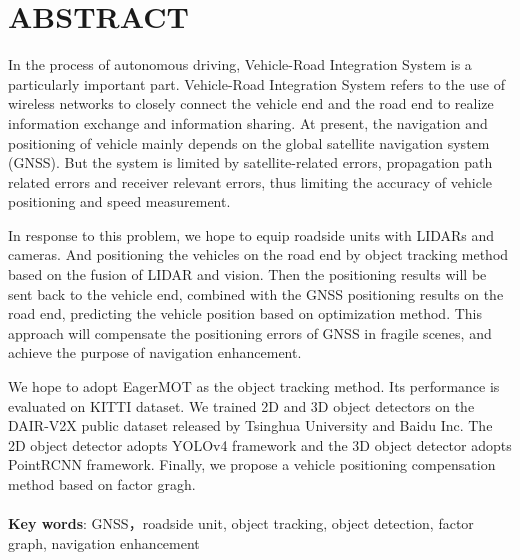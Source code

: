 \newpage
{}
\section*{ABSTRACT}

In the process of autonomous driving, Vehicle-Road Integration System is a particularly important part. Vehicle-Road Integration System refers to the use of wireless networks to closely connect the vehicle end and the road end to realize information exchange and information sharing. At present, the navigation and positioning of vehicle mainly depends on the global satellite navigation system (GNSS). But the system is limited by satellite-related errors, propagation path related errors and receiver relevant errors, thus limiting the accuracy of vehicle positioning and speed measurement.

In response to this problem, we hope to equip roadside units with LIDARs and cameras. And positioning the vehicles on the road end by object tracking method based on the fusion of  
LIDAR and vision. Then the positioning results will be sent back to the vehicle end, combined with the GNSS positioning results on the road end, predicting the vehicle position based on optimization method. This approach will compensate the positioning errors of GNSS in fragile scenes, and achieve the purpose of navigation enhancement.

We hope to adopt EagerMOT as the object tracking method. Its performance is evaluated on KITTI dataset. We trained 2D and 3D object detectors on the DAIR-V2X public dataset released by Tsinghua University and Baidu Inc. The 2D object detector adopts YOLOv4 framework and the 3D object detector adopts PointRCNN framework. Finally, we propose a vehicle positioning compensation method based on factor gragh.\\
~\\ 
\textbf{Key words}: GNSS，roadside unit, object tracking, object detection, factor graph, navigation enhancement

